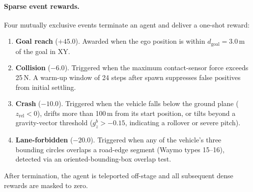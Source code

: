 \paragraph{Sparse event rewards.}
Four mutually exclusive events terminate an agent and deliver a one-shot reward:
\begin{enumerate}[leftmargin=*, itemsep=1pt]
  \item \textbf{Goal reach} ($+45.0$).
  Awarded when the ego position is within $d_{\mathrm{goal}} = 3.0$\,m of the goal in XY.

  \item \textbf{Collision} ($-6.0$).
  Triggered when the maximum contact-sensor force exceeds 25\,N.
  A warm-up window of 24 steps after spawn suppresses false positives from initial settling.

  \item \textbf{Crash} ($-10.0$).
  Triggered when the vehicle falls below the ground plane ($z_{\mathrm{rel}} < 0$), drifts more than 100\,m from its start position, or tilts beyond a gravity-vector threshold ($g^b_z > -0.15$, indicating a rollover or severe pitch).

  \item \textbf{Lane-forbidden} ($-20.0$).
  Triggered when any of the vehicle's three bounding circles overlaps a road-edge segment (Waymo types 15--16), detected via an oriented-bounding-box overlap test.
\end{enumerate}
After termination, the agent is teleported off-stage and all subsequent dense rewards are masked to zero.

